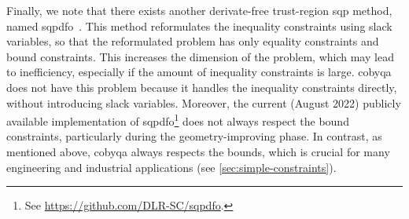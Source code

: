 Finally, we note that there exists another derivate-free trust-region \gls{sqp} method, named \gls{sqpdfo}~\cite{Troltzsch_2016,Gratton_Toint_Troltzsch_2011,Troltzsch_Ilic_Siggel_2021}.
This method reformulates the inequality constraints using slack variables, so that the reformulated problem has only equality constraints and bound constraints.
This increases the dimension of the problem, which may lead to inefficiency, especially if the amount of inequality constraints is large.
\Gls{cobyqa} does not have this problem because it handles the inequality constraints directly, without introducing slack variables.
Moreover, the current (August 2022) publicly available implementation of \gls{sqpdfo}\footnote{See \url{https://github.com/DLR-SC/sqpdfo}.} does not always respect the bound constraints, particularly during the geometry-improving phase.
In contrast, as mentioned above, \gls{cobyqa} always respects the bounds, which is crucial for many engineering and industrial applications (see \cref{sec:simple-constraints}).
